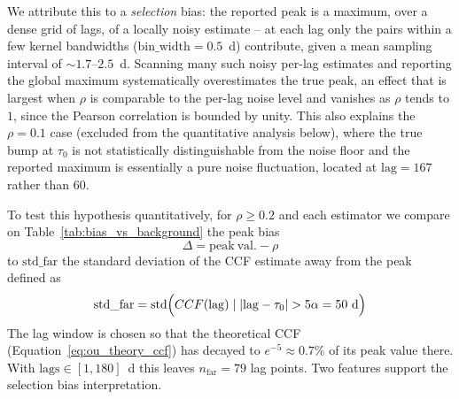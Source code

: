 \documentclass[twocolumn,10pt]{article}
\begin{document}
We attribute this to a \emph{selection} bias: the
reported peak is a maximum, over a dense grid of lags, of a locally noisy
estimate -- at each lag only the pairs within a few kernel bandwidths
($\mathrm{bin\_width}=0.5$~d) contribute, given a mean sampling interval of
$\sim1.7$--$2.5$~d. Scanning many such noisy per-lag estimates and reporting
the global maximum systematically overestimates the true peak, an effect
that is largest when $\rho$ is comparable to the per-lag noise level and
vanishes as $\rho$ tends to $1$, since the Pearson correlation is bounded by unity.
This also explains the $\rho=0.1$ case (excluded from the quantitative
analysis below), where the true bump at $\tau_0$ is not statistically
distinguishable from the noise floor and the reported maximum is essentially
a pure noise fluctuation, located at $\mathrm{lag}=167$ rather than $60$.
%
\begin{table}
	\centering
	\caption{Peak bias $\Delta=\mathrm{peak\_val}-\rho$ compared to the
		background noise level $\mathrm{std\_far}$ (std of the CCF estimate over
		$|\mathrm{lag}-\tau_0|>50$~d, $n_\mathrm{far}=79$), for $\rho\ge0.2$.}
	\label{tab:bias_vs_background}
\end{table}

To test this hypothesis quantitatively, for $\rho\ge0.2$ and each estimator
we compare on Table~\ref{tab:bias_vs_background} the peak bias 
$$\Delta=\mathrm{peak\ val.}-\rho$$ 
to $\mathrm{std\_far}$ the standard deviation of the CCF estimate away from the
peak defined as
$$
\mathrm{std\_far} = \mathrm{std}\Bigl( CCF(\mathrm{lag}) \mid |\mathrm{lag} - \tau_0| > 5\alpha = 50~\mathrm{d} \Bigr)
$$
The lag window is chosen so that the
theoretical CCF (Equation~\ref{eq:ou_theory_ccf}) has decayed to
$e^{-5}\approx0.7\%$ of its peak value there. With $\mathrm{lags}\in[1,180]$~d this
leaves $n_\mathrm{far}=79$ lag points. Two features support the
selection bias interpretation. 
\end{document}
